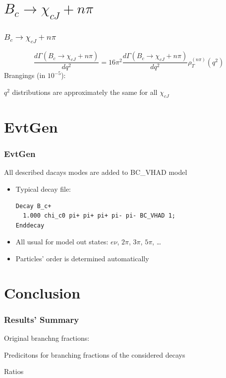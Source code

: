 \documentclass{beamer}
\begin{document}
\section{$B_c\to \chi_{cJ}+n\pi$}
\begin{frame}
  \frametitle{$B_c\to \chi_{cJ}+n\pi$}
  $$
  \frac{d\Gamma\left(B_c \to \chi_{cJ} + n\pi\right)}{dq^2} = 16\pi^2 \frac{d\Gamma\left(B_c \to \chi_{cJ} + n\pi\right)}{dq^2} \rho_T^{(n\pi)}(q^2)
  $$
  Brangings (in $10^{-5}$):
  {\small
    
    }
  $q^2$ distributions are approximately the same for all $\chi_{cJ}$
\end{frame}

\section{EvtGen}
\begin{frame}[fragile]
  \frametitle{EvtGen}
  All described dacays modes are added to BC\_VHAD model
  \begin{itemize}
  \item   Typical decay file:
    \begin{block}{}
\begin{verbatim}
Decay B_c+
  1.000 chi_c0 pi+ pi+ pi+ pi- pi- BC_VHAD 1;
Enddecay
\end{verbatim}
    \end{block}
\item All usual for model out states: $e\nu$, $2\pi$, $3\pi$, $5\pi$, \dots 
\item Particles' order is determined automatically 
\end{itemize}


\end{frame}


\section{Conclusion}
\begin{frame}
  \frametitle{Results' Summary}
  Original branchng fractions:
  {\tiny}
  
  Predicitons for branching fractions of the considered decays
  {\tiny}

  Ratios
  {\tiny}
  
\end{frame}
\end{document}
